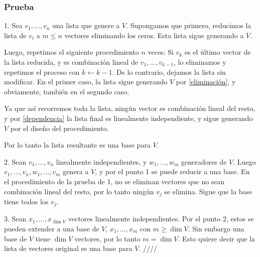 \documentclass{article}
\begin{document}
\subsubsection*{Prueba}
1. Sea $v_1,\ldots,v_n$ una lista que genere a $V$.
Supongamos que primero, reducimos la lista de $v_i$ a $m\leq n$ 
vectores eliminando los ceros. Esta lista sigue generando a $V$.

Luego, repetimos el siguiente procedimiento $n$ veces:
Si $v_k$ es el último vector de la lista reducida, y es
combinación lineal de $v_1,\ldots,v_{k-1}$, lo eliminamos y repetimos el proceso con $k\leftarrow k-1$. De lo contrario, dejamos la lista
sin modificar. En el primer caso, la lista sigue generando $V$ por
\ref{eliminación}, y obviamente, también en el segundo caso.

Ya que así recorremos toda la lista, ningún vector es combinación
lineal del resto, y por \ref{dependencia} la lista final es 
linealmente independiente, y sigue generando $V$ por el diseño
del procedimiento.

Por lo tanto la lista resultante es una base para $V$. 

2. Sean $v_1,\ldots,v_n$ linealmente independientes,
y $w_1,\ldots, w_m$ generadores de $V$.
Luego $v_1,\ldots,v_n,w_1,\ldots,v_m$ genera a $V$, y por
el punto 1 se puede reducir a una base. En el procedimiento de la
prueba de 1, no se eliminan vectores que no sean combinación lineal del
resto, por lo tanto ningún $v_j$ se elimina. Sigue que la base
tiene todos los $v_j$.



3. Sean $x_1,\ldots,x_{\dim V}$ vectores linealmente independientes.
Por el punto 2, estos se pueden extender a una base de $V$,
$x_1,\ldots,x_m$ con $m\geq \dim V$. Sin embargo una base de $V$ tiene
$\dim V$ vectores, por lo tanto $m=\dim V$. Esto quiere decir
que la lista de vectores original es una base para $V$.
\hfill ////
    
\end{document}
